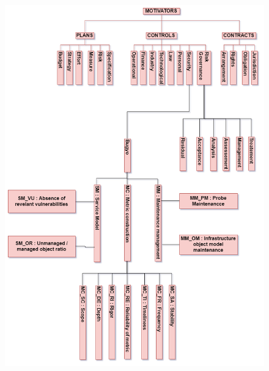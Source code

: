 \documentclass[12pt]{report}
\begin{document}

\begin{figure}[H]
	\begin{Center}
		\includegraphics[width=453.75pt,height=632.45pt]{./media/image24.png}
	\end{Center}
\end{figure}



\vspace{\baselineskip}
\setlength{\parskip}{8.04pt}
\end{document}
